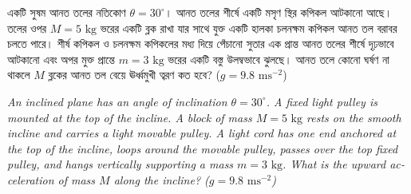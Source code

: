 \documentclass[12pt, a4paper]{article}
\begin{document}
\newpage
\begin{tcolorbox}[questionbox={প্রশ্ন (Question) 46}]
    \noindent
    একটি সুষম আনত তলের নতিকোণ $\theta = 30^\circ$। আনত তলের শীর্ষে একটি মসৃণ স্থির কপিকল আটকানো আছে। তলের ওপর $M = 5\text{ kg}$ ভরের একটি ব্লক রাখা যার সাথে যুক্ত একটি হালকা চলনক্ষম কপিকল আনত তল বরাবর চলতে পারে। শীর্ষ কপিকল ও চলনক্ষম কপিকলের মধ্য দিয়ে পেঁচানো সুতার এক প্রান্ত আনত তলের শীর্ষে দৃঢ়ভাবে আটকানো এবং অপর মুক্ত প্রান্তে $m = 3\text{ kg}$ ভরের একটি বস্তু উলম্বভাবে ঝুলছে। আনত তলে কোনো ঘর্ষণ না থাকলে $M$ ব্লকের আনত তল বেয়ে ঊর্ধ্বমুখী ত্বরণ কত হবে? ($g = 9.8\text{ ms}^{-2}$)
    
    \vspace{0.8em}
    \begin{english}
    \noindent\textit{\color{darkgray}
    An inclined plane has an angle of inclination $\theta = 30^\circ$. A fixed light pulley is mounted at the top of the incline. A block of mass $M = 5\text{ kg}$ rests on the smooth incline and carries a light movable pulley. A light cord has one end anchored at the top of the incline, loops around the movable pulley, passes over the top fixed pulley, and hangs vertically supporting a mass $m = 3\text{ kg}$. What is the upward acceleration of mass $M$ along the incline? ($g = 9.8\text{ ms}^{-2}$)
    }
    \end{english}
\end{tcolorbox}
\end{document}
